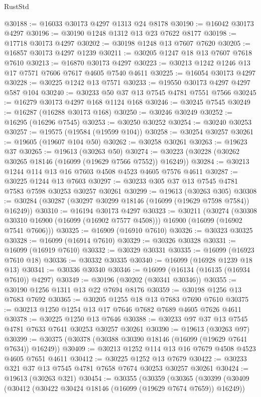 \begin{lexlean}{RustStd}
\begin{coremodule}
@30188 := @16033 @30173 @4297 @1313 @24 @8178
@30190 := @16042 @30173 @4297
@30196 := @30190 @1248 @1312 @13 @23 @7622 @8177
@30198 := @17718 @30173 @4297
@30202 := @30198 @1248 @13 @7607 @7620
@30205 := @16857 @30173 @4297 @1239
@30211 := @30205 @1247 @18 @13 @7607 @7618 @7610
@30213 := @16870 @30173 @4297
@30223 := @30213 @1242 @1246 @13 @17 @7571 @7606 @7617 @4605 @7540 @4611
@30225 := @16054 @30173 @4297
@30228 := @30225 @1242 @13 @7571
@30233 := @19550 @30173 @4297 @4297 @587 @104
@30240 := @30233 @50 @37 @13 @7545 @4781 @7551 @7566
@30245 := @16279 @30173 @4297 @168 @1124 @168
@30246 := @30245 @7545
@30249 := @16287 (@16288 @30173 @168)
@30250 := @30246 @30249
@30252 := @16295 (@16296 @7545)
@30253 := @30250 @30252
@30254 := @30240 @30253
@30257 := @19575 (@19584 (@19599 @104))
@30258 := @30254 @30257
@30261 := @19605 (@19607 @104 @50)
@30262 := @30258 @30261
@30263 := @19623 @37
@30265 := @19613 (@30263 @50)
@30274 := @30223 (@30228 (@30262 @30265 @18146 (@16099 (@19629 @7566 @7552)) @16249))
@30284 := @30213 @1244 @114 @13 @16 @7603 @4508 @4523 @4605 @7576 @4611
@30287 := @30225 @1244 @13 @7603
@30297 := @30233 @305 @37 @13 @7545 @4781 @7583 @7598 @30253 @30257 @30261
@30299 := @19613 (@30263 @305)
@30308 := @30284 (@30287 (@30297 @30299 @18146 (@16099 (@19629 @7598 @7584)) @16249))
@30310 := @16194 @30173 @4297
@30323 := @30211
    (@30274
      (@30308 @30310 @16900 (@16099 (@16902 @7577 @4508)))
      @16900
      (@16099 (@16902 @7541 @7606)))
@30325 := @16909 (@16910 @7610)
@30326 := @30323 @30325
@30328 := @16099 (@16914 @7610)
@30329 := @30326 @30328
@30331 := @16099 (@16919 @7610)
@30332 := @30329 @30331
@30335 := @16099 (@16923 @7610 @18)
@30336 := @30332 @30335
@30340 := @16099 (@16928 @1239 @18 @13)
@30341 := @30336 @30340
@30346 := @16099 (@16134 (@16135 (@16934 @7610)) @4297)
@30349 := @30196 (@30202 (@30341 @30346))
@30355 := @30190 @1256 @1311 @13 @22 @7694 @8176
@30359 := @30198 @1256 @13 @7683 @7692
@30365 := @30205 @1255 @18 @13 @7683 @7690 @7610
@30375 := @30213 @1250 @1254 @13 @17 @7646 @7682 @7689 @4605 @7626 @4611
@30378 := @30225 @1250 @13 @7646
@30388 := @30233 @97 @37 @13 @7545 @4781 @7633 @7641 @30253 @30257 @30261
@30390 := @19613 (@30263 @97)
@30399 := @30375 (@30378 (@30388 @30390 @18146 (@16099 (@19629 @7641 @7634)) @16249))
@30409 := @30213 @1252 @114 @13 @16 @7679 @4508 @4523 @4605 @7651 @4611
@30412 := @30225 @1252 @13 @7679
@30422 := @30233 @321 @37 @13 @7545 @4781 @7658 @7674 @30253 @30257 @30261
@30424 := @19613 (@30263 @321)
@30454 := @30355
    (@30359
      (@30365
        (@30399
          (@30409
            (@30412 (@30422 @30424 @18146 (@16099 (@19629 @7674 @7659)) @16249))

\end{coremodule}
\end{lexlean}
